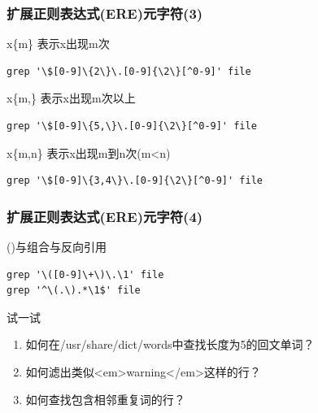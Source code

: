 \documentclass[xcolor=svgnames,presentation]{beamer}
\begin{document}
\begin{frame}[fragile]
\frametitle{扩展正则表达式(ERE)元字符(3)}
\label{sec-1-1-6}
\begin{exampleblock}{x\{m\} 表示x出现m次}
\label{sec-1-1-6-1}


\begin{verbatim}
grep '\$[0-9]\{2\}\.[0-9]{\2\}[^0-9]' file
\end{verbatim}
\end{exampleblock}
\begin{block}{x\{m,\} 表示x出现m次以上}
\label{sec-1-1-6-2}


\begin{verbatim}
grep '\$[0-9]\{5,\}\.[0-9]{\2\}[^0-9]' file
\end{verbatim}
\end{block}
\begin{exampleblock}{x\{m,n\} 表示x出现m到n次(m<n)}
\label{sec-1-1-6-3}


\begin{verbatim}
grep '\$[0-9]\{3,4\}\.[0-9]{\2\}[^0-9]' file
\end{verbatim}
\end{exampleblock}
\end{frame}
\begin{frame}[fragile]
\frametitle{扩展正则表达式(ERE)元字符(4)}
\label{sec-1-1-7}
\begin{exampleblock}{()与\n 组合与反向引用}
\label{sec-1-1-7-1}


\begin{verbatim}
grep '\([0-9]\+\)\.\1' file
grep '^\(.\).*\1$' file
\end{verbatim}
\end{exampleblock}
\begin{block}{试一试}
\label{sec-1-1-7-2}

\begin{enumerate}
\item 如何在/usr/share/dict/words中查找长度为5的回文单词？
\item 如何滤出类似<em>warning</em>这样的行？
\item 如何查找包含相邻重复词的行？
\end{enumerate}
\end{block}
\end{frame}
\end{document}

